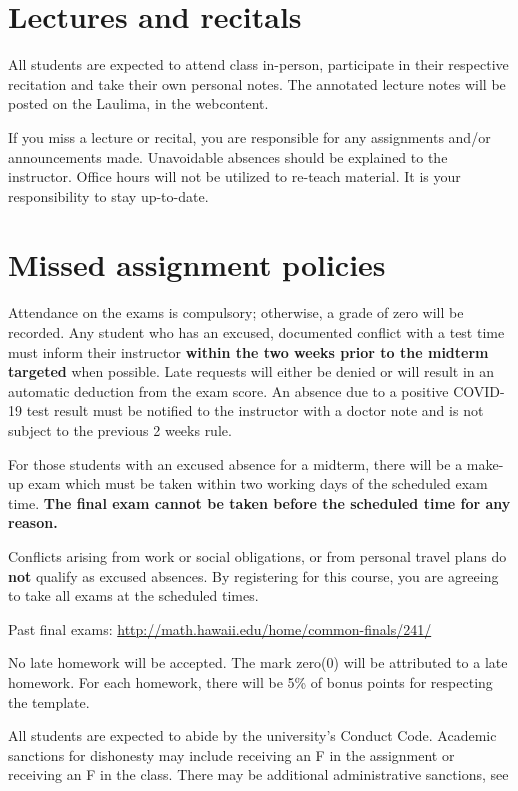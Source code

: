 \documentclass[12pt]{amsart}
\newcommand{\svs}{\vspace{.1cm}}
\begin{document}
\section*{Lectures and recitals}
All students are expected to attend class in-person, participate in their respective recitation and take their own personal notes. The annotated lecture notes will be posted on the Laulima, in the webcontent. 

If you miss a lecture or recital, you are responsible for any assignments and/or announcements made. Unavoidable absences should be explained to the instructor. Office hours will not be utilized to re-teach material. It is your responsibility to stay up-to-date.  

\section*{Missed assignment policies}
  Attendance on the exams is compulsory; otherwise, a grade of zero will be recorded. Any student who has an excused, documented conflict with a test time must inform their instructor \textbf{within the two weeks prior to the midterm targeted} when possible.  Late requests will either be denied or will result in an automatic deduction from the exam score. An absence due to a positive COVID-19 test result must be notified to the instructor with a doctor note and is not subject to the previous 2 weeks rule.

For those students with an excused absence for a midterm, there will be a make-up exam which must be taken within two working days of the scheduled exam time. \textbf{The final exam cannot be taken before the scheduled time for any reason.}

Conflicts arising from work or social obligations, or from personal travel plans do \textbf{not} qualify as excused absences. By registering for this course, you are agreeing to take all exams at the scheduled times.

Past final exams: \url{http://math.hawaii.edu/home/common-finals/241/}
\svs

 No late homework will be accepted. The mark zero(0) will be attributed to a late homework. For each homework, there will be 5\% of bonus points for respecting the template.\svs

All students are expected to abide by the university's Conduct Code. Academic sanctions for dishonesty may include receiving an F in the assignment or receiving an F in the class. There may be additional administrative sanctions, see
\svs
\end{document}
